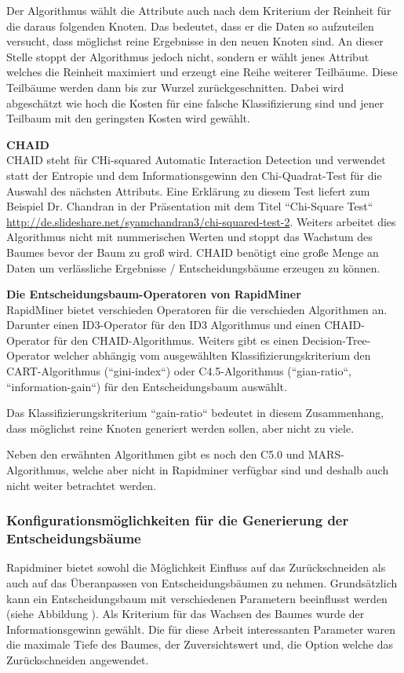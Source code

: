 Der Algorithmus wählt die Attribute auch nach dem Kriterium der Reinheit für die daraus folgenden Knoten. Das bedeutet, dass er die Daten so aufzuteilen versucht, dass möglichst reine Ergebnisse in den neuen Knoten sind. An dieser Stelle stoppt der Algorithmus jedoch nicht, sondern er wählt jenes Attribut welches die Reinheit maximiert und erzeugt  eine Reihe weiterer Teilbäume. Diese Teilbäume werden dann bis zur Wurzel zurückgeschnitten. Dabei wird abgeschätzt wie hoch die Kosten für eine falsche Klassifizierung sind und jener Teilbaum mit den geringsten Kosten wird gewählt. \cite{wei-yin_loh_classification_2008}

\textbf{CHAID} \\
CHAID steht für  CHi-squared Automatic Interaction Detection und verwendet statt der Entropie und dem Informationsgewinn den Chi-Quadrat-Test für die Auswahl des nächsten Attributs. Eine Erklärung zu diesem Test liefert zum Beispiel Dr. Chandran in der Präsentation mit dem Titel ``Chi-Square Test``  \url{http://de.slideshare.net/syamchandran3/chi-squared-test-2}.
Weiters arbeitet dies Algorithmus nicht mit nummerischen Werten und stoppt das Wachstum des Baumes bevor der Baum zu groß wird. CHAID benötigt eine große Menge an Daten um verlässliche Ergebnisse / Entscheidungsbäume erzeugen zu können.\cite{rapidminer_rapidminer_2015}

\textbf{Die Entscheidungsbaum-Operatoren von RapidMiner} \\
RapidMiner bietet verschieden Operatoren für die verschieden Algorithmen an. Darunter einen ID3-Operator für den ID3 Algorithmus und einen CHAID-Operator für den CHAID-Algorithmus. Weiters gibt es einen Decision-Tree-Operator welcher abhängig vom ausgewählten Klassifizierungskriterium den CART-Algorithmus (``gini-index``)  oder C4.5-Algorithmus (``gian-ratio``, ``information-gain``) für den Entscheidungsbaum auswählt. \cite{rapidminer_rapidminer_2015} 

Das Klassifizierungskriterium ``gain-ratio`` bedeutet in diesem Zusammenhang, dass möglichst reine Knoten generiert werden sollen, aber nicht zu viele. \cite{rapidminer_rapidminer_2015} 

Neben den erwähnten Algorithmen gibt es noch den C5.0 und MARS-Algorithmus, welche aber nicht in Rapidminer verfügbar sind und deshalb auch nicht weiter betrachtet werden.

\subsubsection{Konfigurationsmöglichkeiten für die Generierung der Entscheidungsbäume}
Rapidminer bietet sowohl die Möglichkeit Einfluss auf das Zurückschneiden als auch auf das Überanpassen von Entscheidungsbäumen zu nehmen. Grundsätzlich kann ein Entscheidungsbaum mit verschiedenen Parametern beeinflusst werden (siehe Abbildung ). Als Kriterium für das Wachsen des Baumes wurde der Informationsgewinn gewählt. Die für diese Arbeit interessanten Parameter waren die maximale Tiefe des Baumes, der Zuversichtswert und, die Option welche das Zurückschneiden angewendet.

